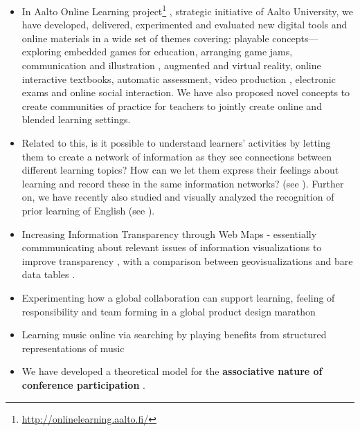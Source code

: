 \documentclass[11pt,letterpaper]{article}
\begin{document}
\begin{itemize}
\begin{itemize}
    \item In Aalto Online Learning
    project\footnote{\url{http://onlinelearning.aalto.fi/}}
    \cite{aalto-online-learning-2017,transforming-uni-2018,designing-learning-2020}, strategic
    initiative of Aalto University, we have developed, delivered, experimented and evaluated new digital tools and online materials in a wide set of themes covering:
    playable concepts---exploring embedded games for education, arranging game jams\cite{gamejams-2021}, communication and illustration \cite{playable-concepts-2020}, augmented and virtual reality, online interactive textbooks, automatic
    assessment, video production \cite{era-of-online-videos-2018}, electronic exams
     and online social interaction. We have also proposed novel concepts to
     create communities of practice for teachers to jointly create online and blended
     learning settings.
     \item Related to this, is it possible to understand learners' activities by
     letting them to create a network of information as they see connections
     between different learning topics? How can we let them express their
     feelings about learning and record these in the same information networks?
     (see \cite{visual-self-assessment-2018}). Further on, we have recently also
     studied and visually analyzed the recognition of prior learning of English
     (see \cite{rpl-test-or-assess-2019}).
    \item Increasing Information Transparency through Web Maps -
   essentially commmunicating about relevant issues of information
   visualizations to improve transparency \cite{AW4city2018}, with a comparison
   between geovisualizations and bare data tables
   \cite{geoviz-data-tables-2018}.
    \item Experimenting how a global collaboration can support learning,
    feeling of responsibility and team forming in a global product design
    marathon \cite{global-design-relay-2017}
    \item Learning music online via searching by playing benefits from
     structured representations of music \cite{MusicOWL-2017}
    \item We have developed a theoretical model for the \textbf{associative
    nature of conference participation} \cite{associative-nature-2016}.


  \end{itemize}


\end{itemize}
\end{document}
